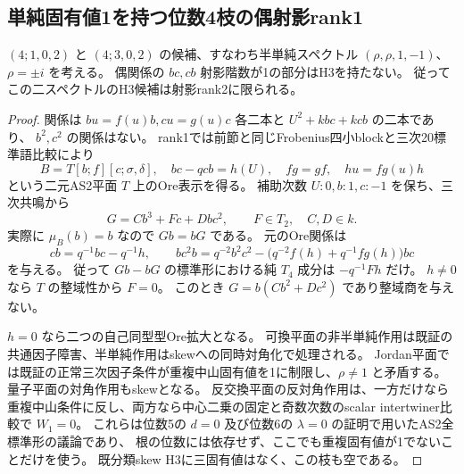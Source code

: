 \subsection{単純固有値1を持つ位数4枝の偶射影rank1}
\label{subsec:cubic-fourth-root-unit-simple-rank1}
\begin{theorem}
\label{thm:cubic-fourth-root-unit-simple-rank1-empty}
$(4;1,0,2)$ と $(4;3,0,2)$ の候補、すなわち半単純スペクトル
$(\rho,\rho,1,-1)$、$\rho=\pm i$ を考える。
偶関係の $bc,cb$ 射影階数が1の部分はH3を持たない。
従ってこの二スペクトルのH3候補は射影rank2に限られる。
\end{theorem}
\begin{proof}
関係は $bu=f(u)b,cu=g(u)c$ 各二本と $U^2+kbc+kcb$ の二本であり、
$b^2,c^2$ の関係はない。
rank1では前節と同じFrobenius四小blockと三次20標準語比較により
\[
 B=T[b;f][c;\sigma,\delta],\quad bc-qcb=h(U),\quad
 fg=gf,\quad h u=fg(u)h
\]
という二元AS2平面 $T$ 上のOre表示を得る。
補助次数 $U:0,b:1,c:-1$ を保ち、三次共鳴から
\[
 G=C b^3+F c+D b c^2,\qquad F\in T_2,\quad C,D\in k.
\]
実際に $\mu_B(b)=b$ なので $Gb=bG$ である。
元のOre関係は
\[
 c b=q^{-1}bc-q^{-1}h,\qquad
 bc^2b=q^{-2}b^2c^2-
       \bigl(q^{-2}f(h)+q^{-1}fg(h)\bigr)bc
\]
を与える。
従って $Gb-bG$ の標準形における純 $T_4$ 成分は $-q^{-1}Fh$ だけ。
$h\ne0$ なら $T$ の整域性から $F=0$。
このとき $G=b(Cb^2+Dc^2)$ であり整域商を与えない。

$h=0$ なら二つの自己同型型Ore拡大となる。
可換平面の非半単純作用は既証の共通因子障害、半単純作用はskewへの同時対角化で処理される。
Jordan平面では既証の正常三次因子条件が重複中山固有値を1に制限し、$\rho\ne1$ と矛盾する。
量子平面の対角作用もskewとなる。
反交換平面の反対角作用は、一方だけなら重複中山条件に反し、両方なら中心二乗の固定と奇数次数のscalar intertwiner比較で $W_1=0$。
これらは位数5の $d=0$ 及び位数6の $\lambda=0$ の証明で用いたAS2全標準形の議論であり、
根の位数には依存せず、ここでも重複固有値が1でないことだけを使う。
既分類skew H3に三固有値はなく、この枝も空である。
\end{proof}

